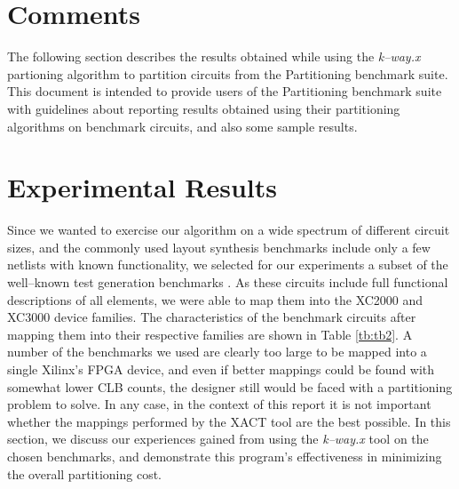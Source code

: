 \textheight 9.0in
\textwidth 6.5in
\oddsidemargin 0.0in
\topmargin -0.5in
\setlength{\floatsep}{0.3cm}
\setlength{\textfloatsep}{0.3cm}
\setlength{\intextsep}{0.3cm}
\newcommand{\definedas} {\stackrel{\Delta} {=}}









\section{Comments}
The following section describes the results obtained while using the 
{\em k--way.x} partioning algorithm \cite{Kuznar93a} to partition circuits
from the Partitioning benchmark suite. This document is intended to provide
users of the Partitioning benchmark suite with guidelines about reporting
results obtained using their partitioning algorithms on benchmark circuits,
and also some sample results.
  

\section{Experimental Results}

\label{sec-results}

Since we wanted to exercise our algorithm on a wide spectrum of 
different circuit sizes, and the commonly used layout synthesis 
benchmarks include only a few netlists with known functionality, we 
selected for our experiments a subset of the well--known test generation 
benchmarks \cite{iscas85,iscas89}.
As these circuits include full functional descriptions of all elements, 
we were able to map them into the XC2000 and XC3000 device families.
The characteristics of the benchmark circuits after mapping them into 
their respective families are shown in Table \ref{tb:tb2}.
A number of the benchmarks we used are clearly too large to be mapped 
into a single Xilinx's FPGA device, and even if better mappings could be 
found with somewhat lower CLB counts, the designer still would be faced 
with a partitioning problem to solve.
In any case, in the context of this report it is not important whether 
the mappings performed by the XACT tool are the best possible.
In this section, we discuss our experiences gained from using the {\sl 
k--way.x} tool on the chosen benchmarks, and demonstrate this program's 
effectiveness in minimizing the overall partitioning cost.

